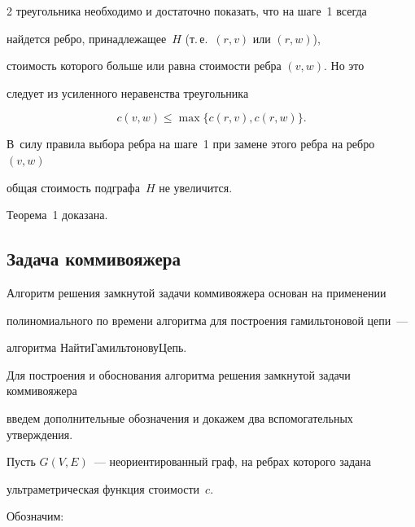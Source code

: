 \begin{multicols}{2}
треугольника необходимо и достаточно показать, что на шаге~1 всегда


найдется ребро, принадлежащее~$H$ (т.\,е.\ $(r,v)$ или $(r,w)$),


стоимость которого больше или равна стоимости ребра $(v,w)$. Но это


следует из усиленного неравенства треугольника





\noindent


$$


c(v,w)  \leq  \max\{c(r,v), c(r,w)\}.


$$


В~силу правила выбора ребра на шаге~1 при замене этого ребра на ребро $(v,w)$


общая стоимость подграфа~$H$ не увеличится.


Теорема~1 доказана.










\subsection{Задача коммивояжера}





Алгоритм решения замкнутой задачи коммивояжера основан на применении


полиномиального по времени алгоритма для построения гамильтоновой цепи~---


алгоритма {\sf НайтиГамильтоновуЦепь}.





Для построения и обоснования алгоритма решения замкнутой задачи коммивояжера


введем дополнительные обозначения и докажем два вспомогательных утверждения.





Пусть $G(V,E)$~--- неориентированный граф, на ребрах которого задана


ультраметрическая функция стоимости~$c$.


Обозначим:






\end{multicols}

